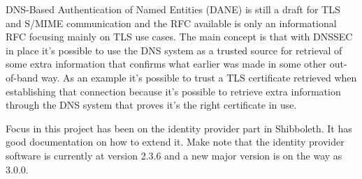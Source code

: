 DNS-Based Authentication of Named Entities (DANE) is still a draft for TLS and S/MIME communication and the RFC available is only an informational RFC focusing mainly on TLS use cases.
The main concept is that with DNSSEC in place it's possible to use the DNS system as a trusted source for retrieval of some extra information that confirms what earlier was made in some other out-of-band way.
As an example it's possible to trust a TLS certificate retrieved when establishing that connection because it's possible to retrieve extra information through the DNS system that proves it's the right certificate in use.

Focus in this project has been on the identity provider part in Shibboleth.
It has good documentation on how to extend it. 
Make note that the identity provider software is currently at version 2.3.6 and a new major version is on the way as 3.0.0.








